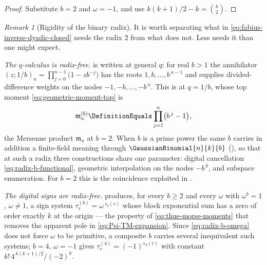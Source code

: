 \documentclass[11pt,a4paper,oneside,openany]{book}
\theoremstyle{definition}
\theoremstyle{remark}
\newtheorem{remark}[remark]{Remark}
\begin{document}
\begin{proof}
Substitute $b=2$ and $\omega=-1$, and use $k(k+1)/2-k=\binom k2$.
\end{proof}

\begin{remark}[Rigidity of the binary radix]\label{rem:binary-radix-rigidity}%
\label{rem:radix-prime-power}
It is worth separating what in \eqref{eq:fabius-inverse-dyadic-closed} needs the radix $2$ from what does not.  Less needs it than one might expect.

\emph{The $q$-calculus is radix-free.}   is written at general $q$: for real $b>1$ the annihilator $(z;1/b)_n=\prod_{j=0}^{n-1}\bigl(1-zb^{-j}\bigr)$ has the roots $1,b,\ldots,b^{\,n-1}$ and supplies divided-difference weights on the nodes $-1,-b,\ldots,-b^{\,n}$.  This is  at $q=1/b$, whose top moment \eqref{eq:geometric-moment-top} is
\[
 \mathfrak m^{(b)}_n\DefinitionEquals\prod_{j=1}^{n}\bigl(b^{\,j}-1\bigr),
\]
the Mersenne product $\mathfrak m_n$ at $b=2$.  When $b$ is a prime power the same $b$ carries in addition a finite-field meaning through $\GaussianBinomial{n}{k}{b}$ (), so that at such a radix three constructions share one parameter: digital cancellation \eqref{eq:radix-b-functional}, geometric interpolation on the nodes $-b^{\,k}$, and subspace enumeration.  For $b=2$ this is the coincidence exploited in .

\emph{The digital signs are radix-free.}   produces, for every $b\ge2$ and every $\omega$ with $\omega^b=1$, $\omega\ne1$, a sign system $\tau^{(b)}_r=\omega^{\,s_b(r)}$ whose block exponential sum has a zero of order exactly $k$ at the origin --- the property of \eqref{eq:thue-morse-moments} that removes the apparent pole in \eqref{eq:Psi-TM-expansion}.  Since \eqref{eq:radix-b-omega} does not force $\omega$ to be primitive, a composite $b$ carries several inequivalent such systems; $b=4$, $\omega=-1$ gives $\tau^{(4)}_r=(-1)^{s_4(r)}$ with constant $k!\,4^{\,k(k+1)/2}/(-2)^k$.


\end{remark}
\end{document}
